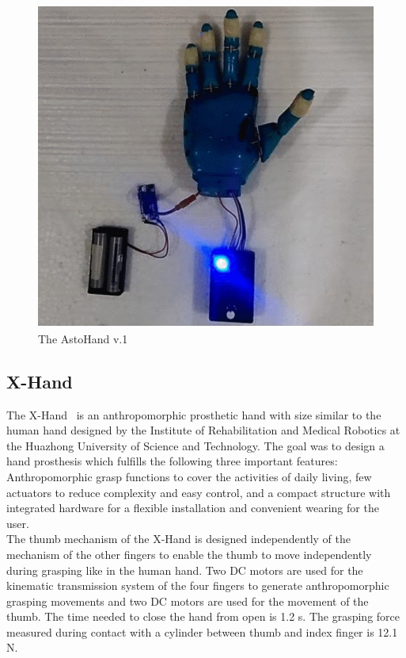 \documentclass[a4paper, 10pt, conference]{ieeeconf}      %
\begin{document}
\begin{figure}[h]

	\centering
	\includegraphics[scale=0.4]{images/AstoHand}
	
	\caption{The AstoHand v.1}
\end{figure}

\subsection{X-Hand}

The X-Hand~\cite{xhand} is an anthropomorphic prosthetic hand with size similar to the human hand designed by the Institute of Rehabilitation and Medical Robotics at the Huazhong University of Science and Technology. The goal was to design a hand prosthesis which fulfills the following three important features: Anthropomorphic grasp functions to cover the activities of daily living, few actuators to reduce complexity and easy control, and a compact structure with integrated hardware for a flexible installation and convenient wearing for the user.\\
The thumb mechanism of the X-Hand is designed independently of the mechanism of the other fingers to enable the thumb to move independently during grasping like in the human hand. Two DC motors are used for the kinematic transmission system of the four fingers to generate anthropomorphic grasping movements and two DC motors are used for the movement of the thumb. The time needed to close the hand from open is 1.2 s. The grasping force measured during contact with a cylinder between thumb and index finger is 12.1 N.
\end{document}
